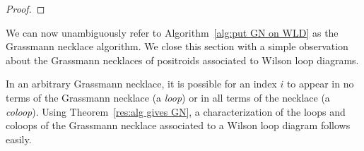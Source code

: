 \documentclass[11pt]{article}
\newcommand{\hlfix}[2]{\texthl{#1}\todo{#2}}
\theoremstyle{remark}
\theoremstyle{definition}
\begin{document}
\begin{proof}
%
%
%
\end{proof}


We can now unambiguously refer to Algorithm~\ref{alg:put GN on WLD} as the Grassmann necklace algorithm. We close this section with a simple observation about the Grassmann necklaces of positroids associated to Wilson loop diagrams.


In an arbitrary Grassmann necklace, it is possible for an index $i$ to appear in no terms of the Grassmann necklace (a {\em loop}) or in all terms of the necklace (a {\em coloop}). Using Theorem~\ref{res:alg gives GN}, a characterization of the loops and coloops of the Grassmann necklace associated to a Wilson loop diagram follows easily.
\end{document}
